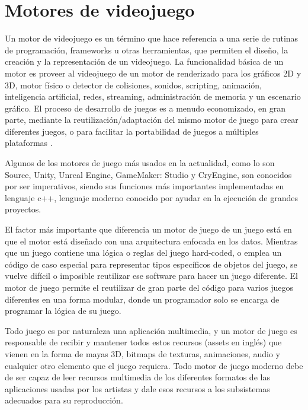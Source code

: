 
\section{Motores de videojuego}  %

\ifpdf
    \graphicspath{{motorJuego/Figs/Raster/}{motorJuego/Figs/PDF/}{motorJuego/Figs/}}
\else
    \graphicspath{{motorJuego/Figs/Vector/}{motorJuego/Figs/}}
\fi

Un motor de videojuego es un término que hace referencia a una serie de rutinas de programación, frameworks u otras herramientas, que permiten el diseño, la creación y la representación de un videojuego. La funcionalidad básica de un motor es proveer al videojuego de un motor de renderizado para los gráficos 2D y 3D, motor físico o detector de colisiones, sonidos, scripting, animación, inteligencia artificial, redes, streaming, administración de memoria y un escenario gráfico. El proceso de desarrollo de juegos es a menudo economizado, en gran parte, mediante la reutilización/adaptación del mismo motor de juego para crear diferentes juegos, o para facilitar la portabilidad de juegos a múltiples plataformas \cite{JasonGregory-GameEngineArchitecture}.

Algunos de los motores de juego más usados en la actualidad, como lo son Source, Unity, Unreal Engine, GameMaker: Studio y CryEngine, son conocidos por ser imperativos, siendo sus funciones más importantes implementadas en lenguaje c++, lenguaje moderno conocido por ayudar en la ejecución de grandes proyectos.

El factor más importante que diferencia un motor de juego de un juego está en que el motor está diseñado con una arquitectura enfocada en los datos. Mientras que un juego contiene una lógica o reglas del juego hard-coded, o emplea un código de caso especial para representar tipos específicos de objetos del juego, se vuelve difícil o imposible reutilizar ese software para hacer un juego diferente. El motor de juego permite el reutilizar de gran parte del código para varios juegos diferentes en una forma modular, donde un programador solo se encarga de programar la lógica de su juego.

Todo juego es por naturaleza una aplicación multimedia, y un motor de juego es responsable de recibir y mantener todos estos recursos (assets en inglés) que vienen en la forma de mayas 3D, bitmaps de texturas, animaciones, audio y cualquier otro elemento que el juego requiera. Todo motor de juego moderno debe de ser capaz de leer recursos multimedia de los diferentes formatos de las aplicaciones usadas por los artistas y dale esos recursos a los subsistemas adecuados para su reproducción.

